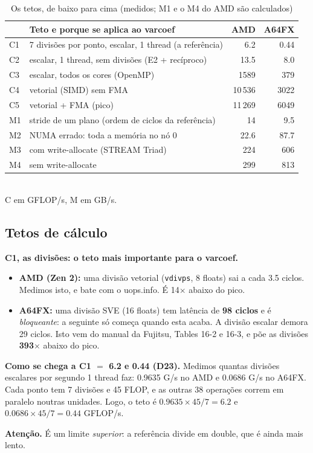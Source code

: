 \documentclass[11pt,a4paper]{article}
\newcommand{\cuidado}[1]{\par\noindent\colorbox{orange!10}{\parbox{\dimexpr\linewidth-2\fboxsep}{\small\textbf{Atenção.} #1}}\par}
\begin{document}
\begin{table}[H]\centering\small
\caption{Os tetos, de baixo para cima (medidos; M1 e o M4 do AMD são calculados)}
\begin{tabular}{@{}llrr@{}}\toprule
 & \textbf{Teto e porque se aplica ao varcoef} & \textbf{AMD} & \textbf{A64FX} \\ \midrule
C1 & 7 divisões por ponto, escalar, 1 thread (a referência) & 6.2 & 0.44 \\
C2 & escalar, 1 thread, sem divisões (E2 + recíproco) & 13.5 & 8.0 \\
C3 & escalar, todos os cores (OpenMP) & 1589 & 379 \\
C4 & vetorial (SIMD) sem FMA & 10\,536 & 3022 \\
C5 & vetorial + FMA (pico) & 11\,269 & 6049 \\ \midrule
M1 & stride de um plano (ordem de ciclos da referência) & 14 & 9.5 \\
M2 & NUMA errado: toda a memória no nó 0 & 22.6 & 87.7 \\
M3 & com write-allocate (STREAM Triad) & 224 & 606 \\
M4 & sem write-allocate & 299 & 813 \\ \bottomrule
\end{tabular}\\[2pt]
\footnotesize C em GFLOP/s, M em GB/s.
\end{table}

\subsection{Tetos de cálculo}
\textbf{C1, as divisões: o teto mais importante para o varcoef.}
\begin{itemize}
\item \textbf{AMD (Zen 2):} uma divisão vetorial (\texttt{vdivps}, 8 floats) sai a cada 3.5 ciclos.
Medimos isto, e bate com o uops.info. É 14$\times$ abaixo do pico.
\item \textbf{A64FX:} uma divisão SVE (16 floats) tem latência de \textbf{98 ciclos} e é
\emph{bloqueante}: a seguinte só começa quando esta acaba. A divisão escalar demora 29 ciclos. Isto vem
do manual da Fujitsu, Tables 16-2 e 16-3, e põe as divisões \textbf{393$\times$} abaixo do pico.
\end{itemize}
\textbf{Como se chega a C1 $=$ 6.2 e 0.44 (D23).} Medimos quantas divisões escalares por segundo 1
thread faz: 0.9635 G/s no AMD e 0.0686 G/s no A64FX. Cada ponto tem 7 divisões e 45 FLOP, e as outras
38 operações correm em paralelo noutras unidades. Logo, o teto é
$0.9635\times45/7 = 6.2$ e $0.0686\times45/7 = 0.44$ GFLOP/s.
\cuidado{É um limite \emph{superior}: a referência divide em double, que é ainda mais lento.}
\end{document}
